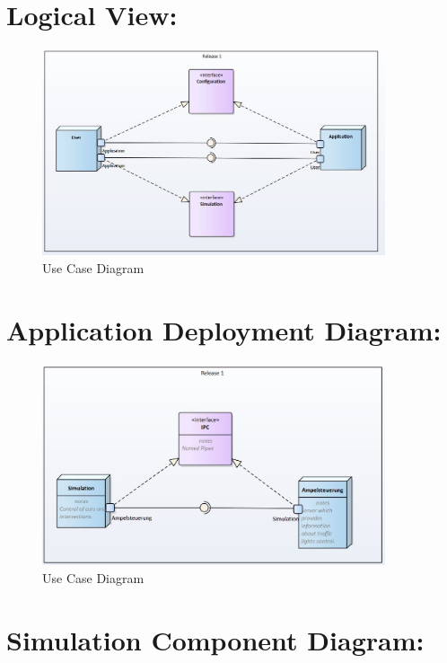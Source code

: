 \chapter{Logical View:}

\begin{figure}[H]
	\centering
	\includegraphics[width=0.9\textwidth]{img/LogicalView.JPG}
	\caption{Use Case Diagram}
	\label{img:LogicalView}
\end{figure}

\chapter{Application Deployment Diagram:}

\begin{figure}[H]
	\centering
	\includegraphics[width=0.9\textwidth]{img/Application_Deployment_Diagram.JPG}
	\caption{Use Case Diagram}
	\label{img:Application_Deployment_Diagram}
\end{figure}

\chapter{Simulation Component Diagram:}

